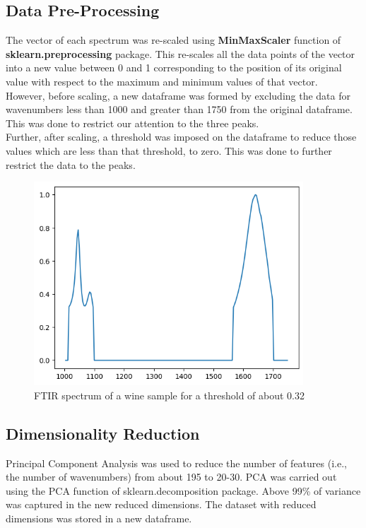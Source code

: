\documentclass{article}
\begin{document}
\subsection{Data Pre-Processing}
The vector of each spectrum was re-scaled using \textbf{MinMaxScaler} function of \textbf{sklearn.preprocessing} package. This re-scales all the data points of the vector into a new value between 0 and 1 corresponding to the position of its original value with respect to the maximum and minimum values of that vector.\\
\newline
However, before scaling, a new dataframe was formed by excluding the data for wavenumbers less than 1000 and greater than 1750 from the original dataframe. This was done to restrict our attention to the three peaks.\\
\newline
Further, after scaling, a threshold was imposed on the dataframe to reduce those values which are less than that threshold, to zero. This was done to further restrict the data to the peaks.\\
\begin{figure}[H]
	\centering
	\includegraphics[height=3in]{Pre-processed Image.png}
	\caption[Optional Caption]{FTIR spectrum of a wine sample for a threshold of about 0.32}
	\label{fig:fig2}
\end{figure}

\subsection{Dimensionality Reduction}
Principal Component Analysis was used to reduce the number of features (i.e., the number of wavenumbers) from about 195 to 20-30. PCA was carried out using the PCA function of sklearn.decomposition package. Above 99\% of variance was captured in the new reduced dimensions. The dataset with reduced dimensions was stored in a new dataframe.\\
\newpage
\end{document}

